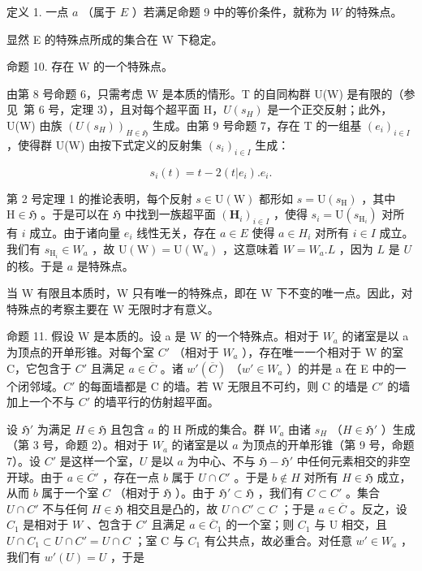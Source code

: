 定义 1. 一点 \(a\) （属于 \(E\) ）若满足命题 9 中的等价条件，就称为 \(W\) 的特殊点。

显然 E 的特殊点所成的集合在 W 下稳定。

命题 10. 存在 W 的一个特殊点。

由第 8 号命题 6，只需考虑 W 是本质的情形。T 的自同构群 U(W) 是有限的（参见~第 6 号，定理 3），且对每个超平面 H，\(U(s_{H})\) 是一个正交反射；此外，U(W) 由族 \((U(s_{H}))_{H \in \mathfrak{H}}\) 生成。由第 9 号命题 7，存在 T 的一组基 \((e_{i})_{i \in I}\) ，使得群 U(W) 由按下式定义的反射集 \((s_{i})_{i \in I}\) 生成：

\[
s _ {i} (t) = t - 2 (t | e _ {i}). e _ {i}.
\]

第 2 号定理 1 的推论表明，每个反射 \(s \in \mathrm{U}(\mathrm{W})\) 都形如 \(s = \mathrm{U}(s_{\mathrm{H}})\) ，其中 \(\mathrm{H} \in \mathfrak{H}\) 。于是可以在 \(\mathfrak{H}\) 中找到一族超平面 \((\mathbf{H}_i)_{i \in I}\) ，使得 \(s_i = \mathrm{U}(s_{\mathrm{H}_i})\) 对所有 \(i\) 成立。由于诸向量 \(e_i\) 线性无关，存在 \(a \in E\) 使得 \(a \in H_i\) 对所有 \(i \in I\) 成立。我们有 \(s_{\mathrm{H}_i} \in W_a\) ，故 \(\mathrm{U}(\mathrm{W}) = \mathrm{U}(\mathrm{W}_a)\) ，这意味着 \(W = W_a.L\) ，因为 \(L\) 是 \(U\) 的核。于是 \(a\) 是特殊点。

当 W 有限且本质时，W 只有唯一的特殊点，即在 W 下不变的唯一点。因此，对特殊点的考察主要在 W 无限时才有意义。

命题 11. 假设 W 是本质的。设 a 是 W 的一个特殊点。相对于 \(W_{a}\) 的诸室是以 a 为顶点的开单形锥。对每个室 \(C'\) （相对于 \(W_{a}\) ），存在唯一一个相对于 W 的室 C，它包含于 \(C'\) 且满足 \(a \in \overline{C}\) 。诸 \(w'(\overline{C})\) （\(w' \in W_{a}\) ）的并是 a 在 E 中的一个闭邻域。\(C'\) 的每面墙都是 C 的墙。若 W 无限且不可约，则 C 的墙是 \(C'\) 的墙加上一个不与 \(C'\) 的墙平行的仿射超平面。

设 \(\mathfrak{H}'\) 为满足 \(H \in \mathfrak{H}\) 且包含 \(a\) 的 H 所成的集合。群 \(W_a\) 由诸 \(s_H\) （\(H \in \mathfrak{H}'\) ）生成（第 3 号，命题 2）。相对于 \(W_a\) 的诸室是以 \(a\) 为顶点的开单形锥（第 9 号，命题 7）。设 \(C'\) 是这样一个室，\(U\) 是以 \(a\) 为中心、不与 \(\mathfrak{H} - \mathfrak{H}'\) 中任何元素相交的非空开球。由于 \(a \in \overline{C'}\) ，存在一点 \(b\) 属于 \(U \cap C'\) 。于是 \(b \notin H\) 对所有 \(H \in \mathfrak{H}\) 成立，从而 \(b\) 属于一个室 \(C\) （相对于 \(\mathfrak{H}\) ）。由于 \(\mathfrak{H}' \subset \mathfrak{H}\) ，我们有 \(C \subset C'\) 。集合 \(U \cap C'\) 不与任何 \(H \in \mathfrak{H}\) 相交且是凸的，故 \(U \cap C' \subset C\) ；于是 \(a \in \overline{C}\) 。反之，设 \(C_1\) 是相对于 \(W\) 、包含于 \(C'\) 且满足 \(a \in \overline{C}_{1}\) 的一个室；则 \(C_{1}\) 与 U 相交，且 \(U \cap C_{1} \subset U \cap C' = U \cap C\) ；室 C 与 \(C_{1}\) 有公共点，故必重合。对任意 \(w' \in W_{a}\) ，我们有 \(w'(U) = U\) ，于是

